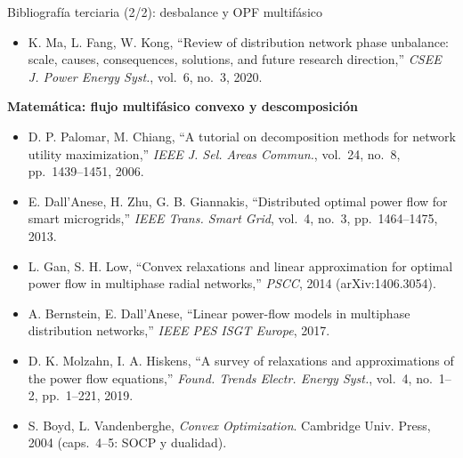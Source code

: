 \documentclass[aspectratio=169,10pt,t]{beamer}
\begin{document}
\begin{frame}{Bibliografía terciaria (2/2): desbalance y OPF multifásico}
\begin{itemize}
    \item[{[T15]}] K. Ma, L. Fang, W. Kong, ``Review of distribution network phase unbalance: scale, causes, consequences, solutions, and future research direction,'' \emph{CSEE J. Power Energy Syst.}, vol.~6, no.~3, 2020.
  \end{itemize}
  \textbf{\color{usachT}Matemática: flujo multifásico convexo y descomposición}
  \begin{itemize}\setlength\itemsep{0.5pt}
    \item[{[T16]}] D. P. Palomar, M. Chiang, ``A tutorial on decomposition methods for network utility maximization,'' \emph{IEEE J. Sel. Areas Commun.}, vol.~24, no.~8, pp.~1439--1451, 2006.
    \item[{[T17]}] E. Dall'Anese, H. Zhu, G. B. Giannakis, ``Distributed optimal power flow for smart microgrids,'' \emph{IEEE Trans. Smart Grid}, vol.~4, no.~3, pp.~1464--1475, 2013.
    \item[{[T18]}] L. Gan, S. H. Low, ``Convex relaxations and linear approximation for optimal power flow in multiphase radial networks,'' \emph{PSCC}, 2014 (arXiv:1406.3054).
    \item[{[T19]}] A. Bernstein, E. Dall'Anese, ``Linear power-flow models in multiphase distribution networks,'' \emph{IEEE PES ISGT Europe}, 2017.
    \item[{[T20]}] D. K. Molzahn, I. A. Hiskens, ``A survey of relaxations and approximations of the power flow equations,'' \emph{Found. Trends Electr. Energy Syst.}, vol.~4, no.~1--2, pp.~1--221, 2019.
    \item[{[T21]}] S. Boyd, L. Vandenberghe, \emph{Convex Optimization}. Cambridge Univ. Press, 2004 (caps.~4--5: SOCP y dualidad).
  \end{itemize}
\end{frame}
\end{document}
